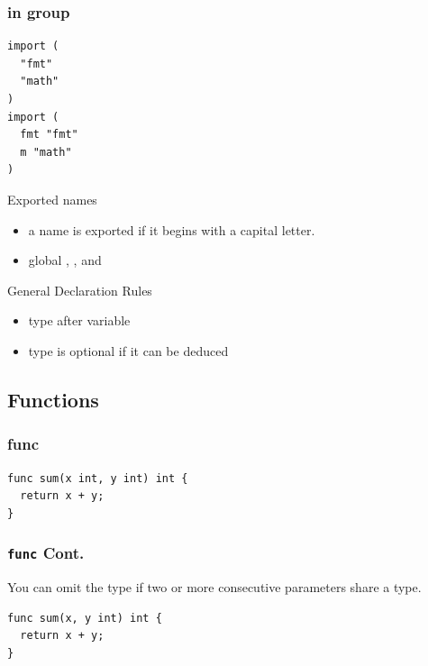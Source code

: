 \documentclass[xetex,mathserif,serif,12pt]{beamer}
\begin{document}
\begin{frame}[fragile]
  \frametitle{in group}

  \begin{beamer@nomargin}
    \begin{lstlisting}[basicstyle=\small\ttfamily]
import (
  "fmt"
  "math"
)
import (
  fmt "fmt"
  m "math"
)
    \end{lstlisting}
  \end{beamer@nomargin}
\end{frame}

\begin{frame}{Exported names}
  \begin{itemize}
  \item a name is exported if it begins with a capital letter.
  \item global , ,  and
  \end{itemize}
\end{frame}

\begin{frame}{General Declaration Rules}

  \begin{itemize}
  \item type after variable
  \item type is optional if it can be deduced
  \end{itemize}

\end{frame}

\subsection{Functions}

\begin{frame}[fragile]
  \frametitle{\ttfamily func}

  \begin{beamer@nomargin}
    \begin{lstlisting}
func sum(x int, y int) int {
  return x + y;
}
    \end{lstlisting}
  \end{beamer@nomargin}
\end{frame}

\begin{frame}[fragile]
  \frametitle{\texttt{func} Cont.}

  You can omit the type if two or more consecutive parameters share a type.
  \newline

  \begin{beamer@nomargin}
    \begin{lstlisting}
func sum(x, y int) int {
  return x + y;
}
    \end{lstlisting}
  \end{beamer@nomargin}
\end{frame}
\end{document}
